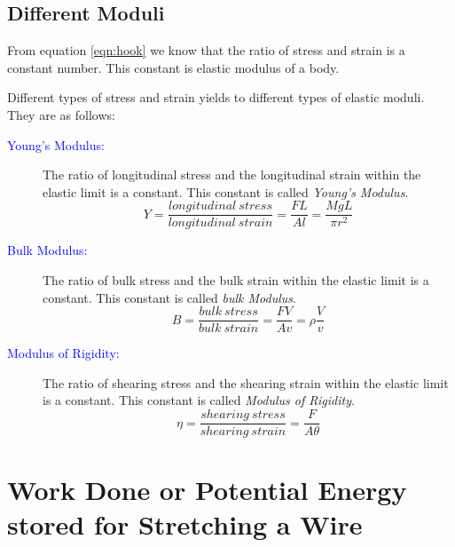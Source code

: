 \documentclass{article}
\begin{document}
    \subsection{Different Moduli}
        From  equation \ref{eqn:hook} we know that the ratio of stress and strain is a constant number. This constant is elastic modulus of a body.
        
        Different types of stress and strain yields to different types of elastic moduli. They are as follows:
        
        \begin{description}
        
            \item[\textcolor{blue}{Young's Modulus:}]
                The ratio of longitudinal stress and the longitudinal strain within the elastic limit is a constant. This constant is called \textit{Young's Modulus}.
                    \begin{equation}
                        Y = \frac{longitudinal~stress}{longitudinal~strain} = \frac{FL}{Al} = \frac{MgL}{\pi r^2}
                        \label{eqn:modulusY}
                    \end{equation}
                
            \item[\textcolor{blue}{Bulk Modulus:}]
                The ratio of bulk stress and the bulk strain within the elastic limit is a constant. This constant is called \textit{bulk Modulus}.
                    \begin{equation}
                        B = \frac{bulk~stress}{bulk~strain} = \frac{FV}{Av} = \rho \frac{V}{v}
                    \end{equation}
                
            \item[\textcolor{blue}{Modulus of Rigidity:}]
                The ratio of shearing stress and the shearing strain within the elastic limit is a constant. This constant is called \textit{Modulus of Rigidity}.
                    \begin{equation}
                        \eta = \frac{shearing~stress}{shearing~strain} = \frac{F}{A\theta}
                    \end{equation}
                    
        \end{description}
        
        
\section{Work Done or Potential Energy stored for Stretching a Wire}
\end{document}
